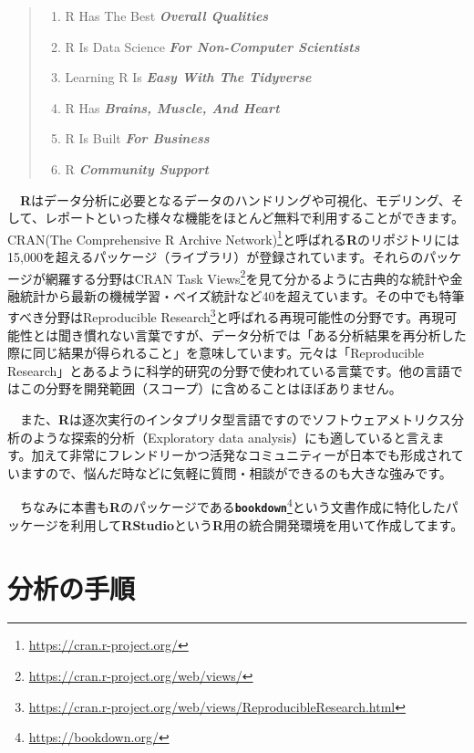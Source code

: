 \documentclass[
  12pt,
]{book}
\DeclareRobustCommand{\href}[2]{#2\footnote{\url{#1}}}
\providecommand{\tightlist}{%
  \setlength{\itemsep}{0pt}\setlength{\parskip}{0pt}}
\begin{document}
\begin{quote}
\begin{enumerate}
\def\labelenumi{\arabic{enumi}.}
\tightlist
\item
  R Has The Best \emph{\textbf{Overall Qualities}}
\item
  R Is Data Science \emph{\textbf{For Non-Computer Scientists}}
\item
  Learning R Is \emph{\textbf{Easy With The Tidyverse}}
\item
  R Has \emph{\textbf{Brains, Muscle, And Heart}}
\item
  R Is Built \emph{\textbf{For Business}}
\item
  R \emph{\textbf{Community Support}}
\end{enumerate}
\end{quote}

　\textbf{R}はデータ分析に必要となるデータのハンドリングや可視化、モデリング、そして、レポートといった様々な機能をほとんど無料で利用することができます。\href{https://cran.r-project.org/}{CRAN(The Comprehensive R Archive Network)}と呼ばれる\textbf{R}のリポジトリには15,000を超えるパッケージ（ライブラリ）が登録されています。それらのパッケージが網羅する分野は\href{https://cran.r-project.org/web/views/}{CRAN Task Views}を見て分かるように古典的な統計や金融統計から最新の機械学習・ベイズ統計など40を超えています。その中でも特筆すべき分野は\href{https://cran.r-project.org/web/views/ReproducibleResearch.html}{Reproducible Research}と呼ばれる再現可能性の分野です。再現可能性とは聞き慣れない言葉ですが、データ分析では「ある分析結果を再分析した際に同じ結果が得られること」を意味しています。元々は「Reproducible Research」とあるように科学的研究の分野で使われている言葉です。他の言語ではこの分野を開発範囲（スコープ）に含めることはほぼありません。

　また、\textbf{R}は逐次実行のインタプリタ型言語ですのでソフトウェアメトリクス分析のような探索的分析（Exploratory data analysis）にも適していると言えます。加えて非常にフレンドリーかつ活発なコミュニティーが日本でも形成されていますので、悩んだ時などに気軽に質問・相談ができるのも大きな強みです。

　ちなみに本書も\textbf{R}のパッケージである\href{https://bookdown.org/}{\textbf{\texttt{bookdown}}}という文書作成に特化したパッケージを利用して\textbf{RStudio}という\textbf{R}用の統合開発環境を用いて作成してます。

\hypertarget{ux5206ux6790ux306eux624bux9806}{%
\section*{分析の手順}\label{ux5206ux6790ux306eux624bux9806}}
\end{document}
